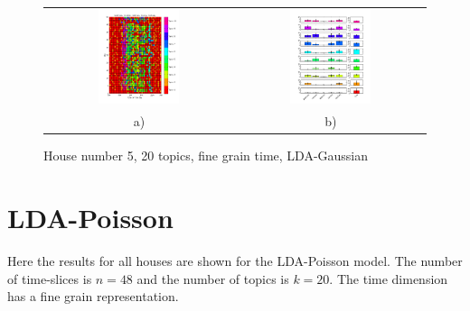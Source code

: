 \begin{figure}[h!]
 \centering
 \begin{tabular}{c c}
  \includegraphics[width=0.45\textwidth]{Pictures/Gaus/fine/DayHN5TS48k20fine.png}
  &
  \includegraphics[width=0.45\textwidth]{Pictures/Gaus/fine/TopHN5TS48k20fine.png}\\
  a) & b)
 \end{tabular}
  \caption{House number 5, 20 topics, fine grain time, LDA-Gaussian}
\end{figure}

\chapter{LDA-Poisson}
Here the results for all houses are shown for the LDA-Poisson model. The number of time-slices is $n=48$ and the number of topics is $k=20$. The time dimension has a fine grain representation.



